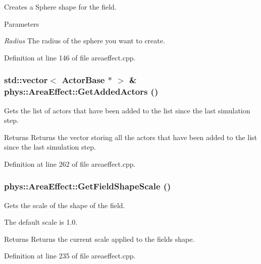Creates a Sphere shape for the field. 


\begin{DoxyParams}{Parameters}
\item[{\em Radius}]The radius of the sphere you want to create. \end{DoxyParams}


Definition at line 146 of file areaeffect.cpp.

\hypertarget{classphys_1_1AreaEffect_a72a9673c926ce876df630c4aecfc09f6}{
\subsubsection[{GetAddedActors}]{\setlength{\rightskip}{0pt plus 5cm}std::vector$<$ {\bf ActorBase} $\ast$ $>$ \& phys::AreaEffect::GetAddedActors ()}}
\label{d4/d55/classphys_1_1AreaEffect_a72a9673c926ce876df630c4aecfc09f6}


Gets the list of actors that have been added to the list since the last simulation step. 

\begin{DoxyReturn}{Returns}
Returns the vector storing all the actors that have been added to the list since the last simulation step. 
\end{DoxyReturn}


Definition at line 262 of file areaeffect.cpp.

\hypertarget{classphys_1_1AreaEffect_a251d82e373c6ada5b80c023434e513f6}{
\subsubsection[{GetFieldShapeScale}]{ phys::AreaEffect::GetFieldShapeScale ()}}
\label{d4/d55/classphys_1_1AreaEffect_a251d82e373c6ada5b80c023434e513f6}


Gets the scale of the shape of the field. 

The default scale is 1.0. \begin{DoxyReturn}{Returns}
Returns the current scale applied to the fields shape. 
\end{DoxyReturn}


Definition at line 235 of file areaeffect.cpp.

